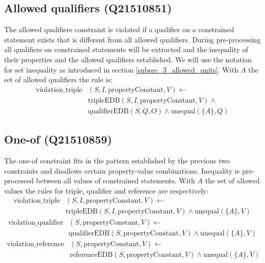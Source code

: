 \documentclass[hyperref,bachelorofscience,fleqn]{cgvpub}
\begin{document}
\subsection{Allowed qualifiers (Q21510851)}
The allowed qualifiers constraint is violated if a qualifier on a constrained statement exists that is different from all allowed qualifiers. During pre-processing all qualifiers on constrained statements will be extracted and the inequality of their properties and the allowed qualifiers established. We will use the notation for set inequality as introduced in section \ref{subsec_3_allowed_units}. With \(A\) the set of allowed qualifiers the rule is:
\begin{equation*}
\begin{split}
\text{violation\_triple}&(S, I, \text{propertyConstant}, V) \leftarrow \\
&\text{tripleEDB}(S, I, \text{propertyConstant}, V) \wedge \\
&\text{qualifierEDB}(S, Q, O) \wedge \text{unequal}(\{A\}, Q)
\end{split}
\end{equation*}

\subsection{One-of (Q21510859)}
The one-of constraint fits in the pattern established by the previous two constraints and disallows certain property-value combinations. Inequality is pre-processed between all values of constrained statements. With \(A\) the set of allowed values the rules for triple, qualifier and reference are respectively:
\begin{equation*}
\begin{split}
\text{violation\_triple}&(S, I, \text{propertyConstant}, V) \leftarrow \\
&\text{tripleEDB}(S, I, \text{propertyConstant}, V) \wedge \text{unequal}(\{A\}, V)
\end{split}
\end{equation*}
\begin{equation*}
\begin{split}
\text{violation\_qualifier}&(S, \text{propertyConstant}, V) \leftarrow \\
&\text{qualifierEDB}(S, \text{propertyConstant}, V) \wedge \text{unequal}(\{A\}, V)
\end{split}
\end{equation*}
\begin{equation*}
\begin{split}
\text{violation\_reference}&(S, \text{propertyConstant}, V) \leftarrow \\
&\text{referenceEDB}(S, \text{propertyConstant}, V) \wedge \text{unequal}(\{A\}, V)
\end{split}
\end{equation*}
\end{document}
